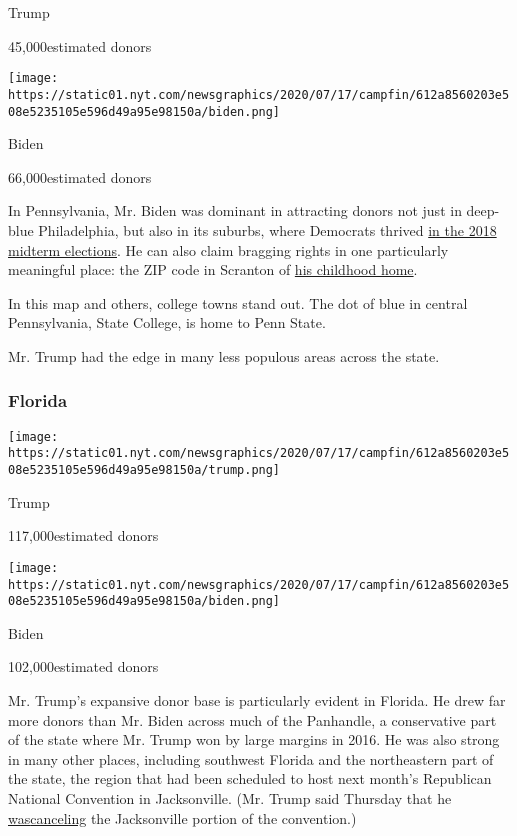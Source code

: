 Trump

45,000estimated donors

\texttt{[image: https://static01.nyt.com/newsgraphics/2020/07/17/campfin/612a8560203e508e5235105e596d49a95e98150a/biden.png]}

Biden

66,000estimated donors

In Pennsylvania, Mr. Biden was dominant in attracting donors not just in
deep-blue Philadelphia, but also in its suburbs, where Democrats thrived
\href{https://www.nytimes.com/2018/11/06/us/politics/pennsylvania-democrats-midterms.html}{in
the 2018 midterm elections}. He can also claim bragging rights in one
particularly meaningful place: the ZIP code in Scranton of
\href{https://thecaucus.blogs.nytimes.com/2008/09/01/biden-arrives-home/}{his
childhood home}.

In this map and others, college towns stand out. The dot of blue in
central Pennsylvania, State College, is home to Penn State.

Mr. Trump had the edge in many less populous areas across the state.

\hypertarget{florida}{%
\subsubsection{Florida}\label{florida}}

\texttt{[image: https://static01.nyt.com/newsgraphics/2020/07/17/campfin/612a8560203e508e5235105e596d49a95e98150a/trump.png]}

Trump

117,000estimated donors

\texttt{[image: https://static01.nyt.com/newsgraphics/2020/07/17/campfin/612a8560203e508e5235105e596d49a95e98150a/biden.png]}

Biden

102,000estimated donors

Mr. Trump's expansive donor base is particularly evident in Florida. He
drew far more donors than Mr. Biden across much of the Panhandle, a
conservative part of the state where Mr. Trump won by large margins in
2016. He was also strong in many other places, including southwest
Florida and the northeastern part of the state, the region that had been
scheduled to host next month's Republican National Convention in
Jacksonville. (Mr. Trump said Thursday that he
\href{https://www.nytimes.com/2020/07/23/us/politics/jacksonville-rnc.html}{was}\href{https://www.nytimes.com/2020/07/23/us/politics/jacksonville-rnc.html}{canceling}
the Jacksonville portion of the convention.)

